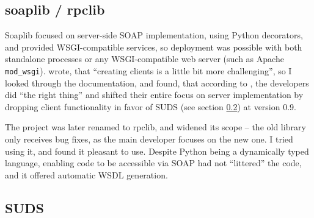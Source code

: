 \subsection{soaplib / rpclib}

Soaplib focused on server-side SOAP implementation, using Python decorators, and provided WSGI-compatible services, so deployment was possible with both standalone processes or any WSGI-compatible web server (such as Apache \verb|mod_wsgi|). \cite{so-206154} wrote, that ``creating clients is a little bit more challenging'', so I looked through the documentation, and found, that according to \cite{soaplib2-changelog}, the developers did ``the right thing'' and shifted their entire focus on server implementation by dropping client functionality in favor of SUDS (see section \ref{suds}) at version 0.9.

The project was later renamed to rpclib, and widened its scope -- the old library only receives bug fixes, as the main developer focuses on the new one. I tried using it, and found it pleasant to use. Despite Python being a dynamically typed language, enabling code to be accessible via SOAP had not ``littered'' the code, and it offered automatic WSDL generation.

\subsection{SUDS}
\label{suds}

